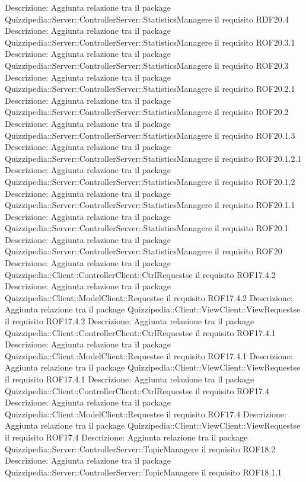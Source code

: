 Descrizione: Aggiunta relazione tra il package Quizzipedia::Server::ControllerServer::StatisticsManagere il requisito RDF20.4 
Descrizione: Aggiunta relazione tra il package Quizzipedia::Server::ControllerServer::StatisticsManagere il requisito ROF20.3.1 
Descrizione: Aggiunta relazione tra il package Quizzipedia::Server::ControllerServer::StatisticsManagere il requisito ROF20.3 
Descrizione: Aggiunta relazione tra il package Quizzipedia::Server::ControllerServer::StatisticsManagere il requisito ROF20.2.1 
Descrizione: Aggiunta relazione tra il package Quizzipedia::Server::ControllerServer::StatisticsManagere il requisito ROF20.2 
Descrizione: Aggiunta relazione tra il package Quizzipedia::Server::ControllerServer::StatisticsManagere il requisito ROF20.1.3 
Descrizione: Aggiunta relazione tra il package Quizzipedia::Server::ControllerServer::StatisticsManagere il requisito ROF20.1.2.1 
Descrizione: Aggiunta relazione tra il package Quizzipedia::Server::ControllerServer::StatisticsManagere il requisito ROF20.1.2 
Descrizione: Aggiunta relazione tra il package Quizzipedia::Server::ControllerServer::StatisticsManagere il requisito ROF20.1.1 
Descrizione: Aggiunta relazione tra il package Quizzipedia::Server::ControllerServer::StatisticsManagere il requisito ROF20.1 
Descrizione: Aggiunta relazione tra il package Quizzipedia::Server::ControllerServer::StatisticsManagere il requisito ROF20 
Descrizione: Aggiunta relazione tra il package Quizzipedia::Client::ControllerClient::CtrlRequestse il requisito ROF17.4.2 
Descrizione: Aggiunta relazione tra il package Quizzipedia::Client::ModelClient::Requestse il requisito ROF17.4.2 
Descrizione: Aggiunta relazione tra il package Quizzipedia::Client::ViewClient::ViewRequestse il requisito ROF17.4.2 
Descrizione: Aggiunta relazione tra il package Quizzipedia::Client::ControllerClient::CtrlRequestse il requisito ROF17.4.1 
Descrizione: Aggiunta relazione tra il package Quizzipedia::Client::ModelClient::Requestse il requisito ROF17.4.1 
Descrizione: Aggiunta relazione tra il package Quizzipedia::Client::ViewClient::ViewRequestse il requisito ROF17.4.1 
Descrizione: Aggiunta relazione tra il package Quizzipedia::Client::ControllerClient::CtrlRequestse il requisito ROF17.4 
Descrizione: Aggiunta relazione tra il package Quizzipedia::Client::ModelClient::Requestse il requisito ROF17.4 
Descrizione: Aggiunta relazione tra il package Quizzipedia::Client::ViewClient::ViewRequestse il requisito ROF17.4 
Descrizione: Aggiunta relazione tra il package Quizzipedia::Server::ControllerServer::TopicManagere il requisito ROF18.2 
Descrizione: Aggiunta relazione tra il package Quizzipedia::Server::ControllerServer::TopicManagere il requisito ROF18.1.1 

